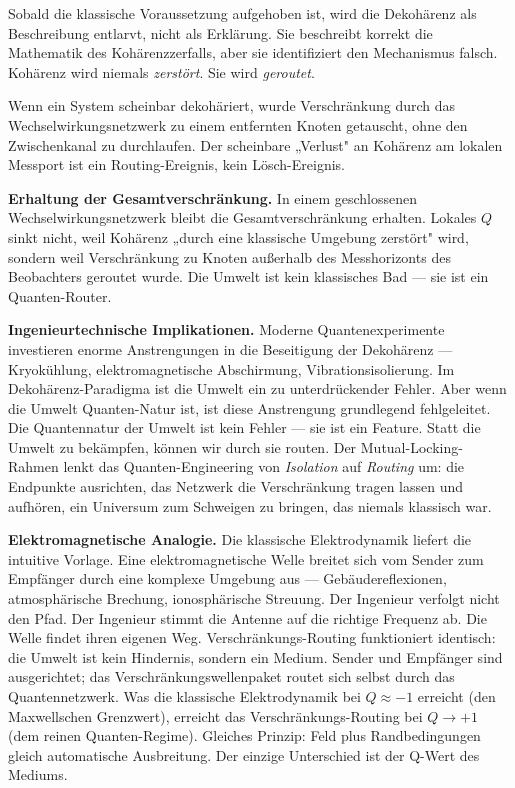 \documentclass[12pt]{article}
\begin{document}
Sobald die klassische Voraussetzung aufgehoben ist, wird die Dekohärenz als Beschreibung entlarvt, nicht als Erklärung. Sie beschreibt korrekt die Mathematik des Kohärenzzerfalls, aber sie identifiziert den Mechanismus falsch. Kohärenz wird niemals \textit{zerstört}. Sie wird \textit{geroutet}.

Wenn ein System scheinbar dekohäriert, wurde Verschränkung durch das Wechselwirkungsnetzwerk zu einem entfernten Knoten getauscht, ohne den Zwischenkanal zu durchlaufen. Der scheinbare „Verlust" an Kohärenz am lokalen Messport ist ein Routing-Ereignis, kein Lösch-Ereignis.

\textbf{Erhaltung der Gesamtverschränkung.} In einem geschlossenen Wechselwirkungsnetzwerk bleibt die Gesamtverschränkung erhalten. Lokales $Q$ sinkt nicht, weil Kohärenz „durch eine klassische Umgebung zerstört" wird, sondern weil Verschränkung zu Knoten außerhalb des Messhorizonts des Beobachters geroutet wurde. Die Umwelt ist kein klassisches Bad — sie ist ein Quanten-Router.

\textbf{Ingenieurtechnische Implikationen.} Moderne Quantenexperimente investieren enorme Anstrengungen in die Beseitigung der Dekohärenz — Kryokühlung, elektromagnetische Abschirmung, Vibrationsisolierung. Im Dekohärenz-Paradigma ist die Umwelt ein zu unterdrückender Fehler. Aber wenn die Umwelt Quanten-Natur ist, ist diese Anstrengung grundlegend fehlgeleitet. Die Quantennatur der Umwelt ist kein Fehler — sie ist ein Feature. Statt die Umwelt zu bekämpfen, können wir durch sie routen. Der Mutual-Locking-Rahmen lenkt das Quanten-Engineering von \textit{Isolation} auf \textit{Routing} um: die Endpunkte ausrichten, das Netzwerk die Verschränkung tragen lassen und aufhören, ein Universum zum Schweigen zu bringen, das niemals klassisch war.

\textbf{Elektromagnetische Analogie.} Die klassische Elektrodynamik liefert die intuitive Vorlage. Eine elektromagnetische Welle breitet sich vom Sender zum Empfänger durch eine komplexe Umgebung aus — Gebäudereflexionen, atmosphärische Brechung, ionosphärische Streuung. Der Ingenieur verfolgt nicht den Pfad. Der Ingenieur stimmt die Antenne auf die richtige Frequenz ab. Die Welle findet ihren eigenen Weg. Verschränkungs-Routing funktioniert identisch: die Umwelt ist kein Hindernis, sondern ein Medium. Sender und Empfänger sind ausgerichtet; das Verschränkungswellenpaket routet sich selbst durch das Quantennetzwerk. Was die klassische Elektrodynamik bei $Q \approx -1$ erreicht (den Maxwellschen Grenzwert), erreicht das Verschränkungs-Routing bei $Q \to +1$ (dem reinen Quanten-Regime). Gleiches Prinzip: Feld plus Randbedingungen gleich automatische Ausbreitung. Der einzige Unterschied ist der Q-Wert des Mediums.
\end{document}
